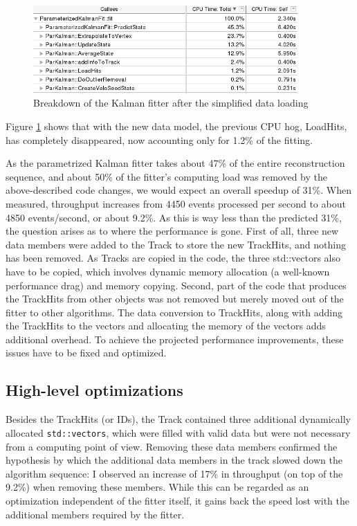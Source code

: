 \documentclass[12pt]{article}
\newcommand{\code}[1]{\texttt{#1}}
\begin{document}
\begin{figure}[H]
	\begin{center}
		\includegraphics[width=0.9\textwidth]{kalmanfit_simplified_overall_breakdown}
	\end{center}
	\caption[CPU hotspots of the Kalman fitter after optimization]{Breakdown of the Kalman fitter after the simplified data loading}
	\label{fig_kalmanfit_simplified_overall_breakdown}
\end{figure}

Figure \ref{fig_kalmanfit_simplified_overall_breakdown} shows that with the new data model, the previous CPU hog, LoadHits, has completely disappeared, now accounting only for 1.2\% of the fitting.

As the parametrized Kalman fitter takes about 47\% of the entire reconstruction sequence, and about 50\% of the fitter's computing load was removed by the above-described code changes, we would expect an overall speedup of 31\%. When measured, throughput increases from 4450 events processed per second to about 4850 events/second, or about 9.2\%. As this is way less than the predicted 31\%, the question arises as to where the performance is gone. First of all, three new data members were added to the Track to store the new TrackHits, and nothing has been removed. As Tracks are copied in the code, the three std::vectors also have to be copied, which involves dynamic memory allocation (a well-known performance drag) and memory copying. Second, part of the code that produces the TrackHits from other objects was not removed but merely moved out of the fitter to other algorithms. The data conversion to TrackHits, along with adding the TrackHits to the vectors and allocating the memory of the vectors adds additional overhead. To achieve the projected performance improvements, these issues have to be fixed and optimized.


\subsection{High-level optimizations}

Besides the TrackHits (or IDs), the Track contained three additional dynamically allocated \code{std::vectors}, which were filled with valid data but were not necessary from a computing point of view. Removing these data members confirmed the hypothesis by which the additional data members in the track slowed down the algorithm sequence: I observed an increase of 17\% in throughput (on top of the 9.2\%) when removing these members. While this can be regarded as an optimization independent of the fitter itself, it gains back the speed lost with the additional members required by the fitter.
\end{document}
